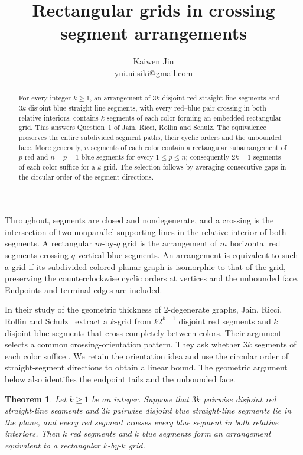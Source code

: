 \documentclass[11pt]{article}
\title{Rectangular grids in crossing segment arrangements}
\author{Kaiwen Jin\\{\small\href{mailto:yui.ui.siki@gmail.com}{yui.ui.siki@gmail.com}}}
\date{}
\newtheorem{theorem}{Theorem}
\begin{document}
\maketitle
\begin{abstract}
For every integer \(k\geq1\), an arrangement of \(3k\) disjoint red
straight-line segments and \(3k\) disjoint blue straight-line segments,
with every red--blue pair crossing in both relative interiors, contains
\(k\) segments of each color forming an embedded rectangular grid.
This answers Question~1 of Jain, Ricci, Rollin and Schulz.
The equivalence preserves the entire subdivided segment paths, their
cyclic orders and the unbounded face.
More generally, \(n\) segments of each color contain a rectangular
subarrangement of \(p\) red and \(n-p+1\) blue segments for every
\(1\leq p\leq n\); consequently \(2k-1\) segments of each color suffice
for a \(k\)-grid.
The selection follows by averaging consecutive gaps in the circular
order of the segment directions.
\end{abstract}

Throughout, segments are closed and nondegenerate, and a crossing is
the intersection of two nonparallel supporting lines in the relative
interior of both segments. A rectangular \(m\)-by-\(q\) grid is the
arrangement of \(m\) horizontal red segments crossing \(q\) vertical
blue segments. An arrangement is equivalent to such a grid if its
subdivided colored planar graph is isomorphic to that of the grid,
preserving the counterclockwise cyclic orders at vertices and the
unbounded face. Endpoints and terminal edges are included.

In their study of the geometric thickness of \(2\)-degenerate graphs,
Jain, Ricci, Rollin and Schulz~\cite[Section~3.1, Lemma~5]{JRRS}
extract a \(k\)-grid from \(k2^{k-1}\) disjoint red segments and \(k\)
disjoint blue segments that cross completely between colors.
Their argument selects a common crossing-orientation pattern.
They ask whether \(3k\) segments of each color suffice
\cite[Section~4, Question~1]{JRRS}. We retain the orientation idea
and use the circular order of straight-segment directions to obtain
a linear bound. The geometric argument below also identifies the
endpoint tails and the unbounded face.

\begin{theorem}\label{thm:original}
Let \(k\geq1\) be an integer. Suppose that \(3k\) pairwise disjoint
red straight-line segments and \(3k\) pairwise disjoint blue
straight-line segments lie in the plane, and every red segment crosses
every blue segment in both relative interiors. Then \(k\) red segments
and \(k\) blue segments form an arrangement equivalent to a rectangular
\(k\)-by-\(k\) grid.
\end{theorem}
\end{document}
